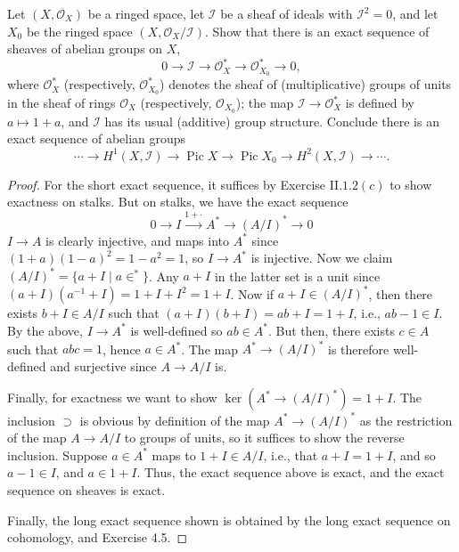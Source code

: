 \documentclass[10pt]{article}
\theoremstyle{definition}
\theoremstyle{remark}
\numberwithin{equation}{section}
\numberwithin{figure}{subsubsection}
\DeclareMathOperator{\Pic}{Pic}
\newcommand{\II}{\mathscr{I}}
\newcommand{\OO}{\mathcal{O}}
\begin{document}
\begin{problem}
  Let $(X,\OO_X)$ be a ringed space, let $\II$ be a sheaf of ideals with $\II^2
  = 0$, and let $X_0$ be the ringed space $(X,\OO_X/\II)$. Show that there is an
  exact sequence of sheaves of abelian groups on $X$,
  \begin{equation*}
    0 \longrightarrow \II \longrightarrow \OO_X^* \longrightarrow \OO_{X_0}^*
    \longrightarrow 0,
  \end{equation*}
  where $\OO_X^*$ (respectively, $\OO_{X_0}^*$) denotes the sheaf of
  (multiplicative) groups of units in the sheaf of rings $\OO_X$ (respectively,
  $\OO_{X_0}$); the map $\II \to \OO_X^*$ is defined by $a \mapsto 1 + a$, and
  $\II$ has its usual (additive) group structure. Conclude there is an exact
  sequence of abelian groups
  \begin{equation*}
    \cdots \longrightarrow H^1(X,\II) \longrightarrow \Pic X \longrightarrow
    \Pic X_0 \longrightarrow H^2(X,\II) \longrightarrow \cdots.
  \end{equation*}
\end{problem}
\begin{proof}
  For the short exact sequence, it suffices by Exercise II.$1.2(c)$ to show
  exactness on stalks. But on stalks, we have the exact sequence
  \begin{equation*}
    0 \longrightarrow I \overset{1 + \cdot}{\longrightarrow} A^* \longrightarrow
    (A/I)^* \longrightarrow 0
  \end{equation*}
  $I \to A$ is clearly injective, and maps into $A^*$ since $(1+a)(1-a)^2 = 1-a^2
  = 1$, so $I \to A^*$ is injective. Now we claim $(A/I)^* = \{a + I \mid a \in
  ^*\}$. Any $a + I$ in the latter set is a unit since
  $(a + I)(a^{-1} + I) = 1 + I + I^2 = 1 + I$. Now if $a + I \in (A/I)^*$, then
  there exists $b+I \in A/I$ such that $(a+I)(b+I) = ab + I = 1 + I$, i.e., $ab
  - 1 \in I$. By the above, $I \to A^*$ is well-defined so $ab \in A^*$. But
  then, there exists $c \in A$ such that $abc = 1$, hence $a \in A^*$. The map
  $A^* \to (A/I)^*$ is therefore well-defined and surjective since $A \to A/I$
  is.
  \par Finally, for exactness we want to show $\ker(A^* \to (A/I)^*) = 1 + I$.
  The inclusion $\supset$ is obvious by definition of the map $A^* \to (A/I)^*$
  as the restriction of the map $A \to A/I$ to groups of units, so it suffices
  to show the reverse inclusion. Suppose $a \in A^*$ maps to $1 + I \in A/I$,
  i.e., that $a + I = 1 + I$, and so $a - 1 \in I$, and $a \in 1 + I$. Thus, the
  exact sequence above is exact, and the exact sequence on sheaves is exact.
  \par Finally, the long exact sequence shown is obtained by the long exact
  sequence on cohomology, and Exercise 4.5.
\end{proof}
\end{document}
